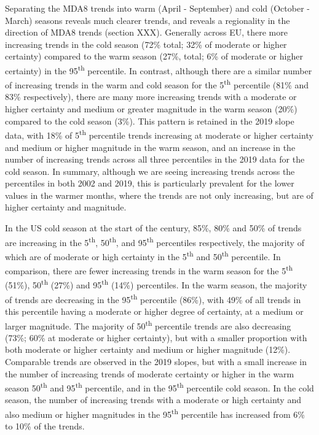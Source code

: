 \documentclass[journal abbreviation, manuscript]{copernicus}
\begin{document}
Separating the MDA8 trends into warm (April - September) and cold (October - March) seasons reveals much clearer trends, and reveals a regionality in the direction of MDA8 trends (section XXX). Generally across EU, there more increasing trends in the cold season (72\% total;  32\% of moderate or higher certainty) compared to the warm season (27\%, total; 6\% of moderate or higher certainty) in the 95\textsuperscript{th} percentile. In contrast, although there are a similar number of increasing trends in the warm and cold season for the 5\textsuperscript{th} percentile (81\% and 83\% respectively), there are many more increasing trends with a moderate or higher certainty and medium or greater magnitude in the warm season (20\%) compared to the cold season (3\%). This pattern is retained in the 2019 slope data, with 18\% of 5\textsuperscript{th} percentile trends increasing at moderate or higher certainty and medium or higher magnitude in the warm season, and an increase in the number of increasing trends across all three percentiles in the 2019 data for the cold season. In summary, although we are seeing increasing trends across the percentiles in both 2002 and 2019, this is particularly prevalent for the lower values in the warmer months, where the trends are not only increasing, but are of higher certainty and magnitude.

In the US cold season at the start of the century, 85\%, 80\% and 50\% of trends are increasing in the 5\textsuperscript{th}, 50\textsuperscript{th}, and 95\textsuperscript{th} percentiles respectively, the majority of which are of moderate or high certainty in the 5\textsuperscript{th} and 50\textsuperscript{th} percentile. In comparison, there are fewer increasing trends in the warm season for the 5\textsuperscript{th} (51\%), 50\textsuperscript{th} (27\%) and 95\textsuperscript{th} (14\%) percentiles. In the warm season, the majority of trends are decreasing in the 95\textsuperscript{th} percentile (86\%), with 49\% of all trends in this percentile having a moderate or higher degree of certainty, at a medium or larger magnitude. The majority of 50\textsuperscript{th} percentile trends are also decreasing (73\%; 60\% at moderate or higher certainty), but with a smaller proportion with both moderate or higher certainty and medium or higher magnitude (12\%). Comparable trends are observed in the 2019 slopes, but with a small increase in the number of increasing trends of moderate certainty or higher in the warm season 50\textsuperscript{th} and 95\textsuperscript{th} percentile, and in the 95\textsuperscript{th} percentile cold season. In the cold season, the number of increasing trends with a moderate or high certainty and also medium or higher magnitudes in the 95\textsuperscript{th} percentile has increased from 6\% to 10\% of the trends.
\end{document}
